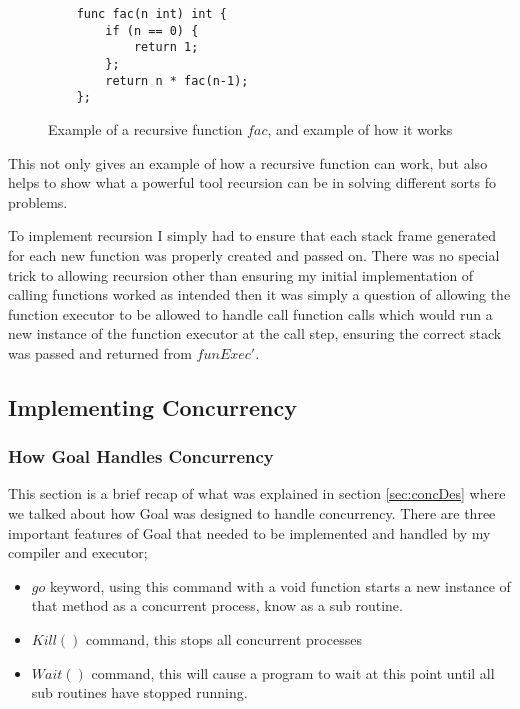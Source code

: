 \begin{figure}
\begin{lstlisting}
	func fac(n int) int {
	    if (n == 0) {
	        return 1;
	    }; 
	    return n * fac(n-1);
	};
\end{lstlisting}
\caption{Example of a recursive function $fac$, and example of how it works }
\label{fig:facExamp}
\end{figure}

This not only gives an example of how a recursive function can work, but also helps to show what a powerful tool recursion can be in solving different sorts fo problems. 

To implement recursion I simply had to ensure that each stack frame generated for each new function was properly created and passed on. There was no special trick to allowing recursion other than ensuring my initial implementation of calling functions worked as intended then it was simply a question of allowing the function executor to be allowed to handle call function calls which would run a new instance of the function executor at the call step, ensuring the correct stack was passed and returned from $funExec'$. 

\subsection{Implementing Concurrency}

\subsubsection{How Goal Handles Concurrency}

This section is a brief recap of what was explained in section \ref{sec:concDes} where we talked about how Goal was designed to handle concurrency. There are three important features of Goal that needed to be implemented and handled by my compiler and executor;

\begin{itemize}
\item $go$ keyword, using this command with a void function starts a new instance of that method as a concurrent process, know as a sub routine.
\item $Kill()$ command, this stops all concurrent processes 
\item $Wait()$ command, this will cause a program to wait at this point until all sub routines have stopped running.
\end{itemize}

